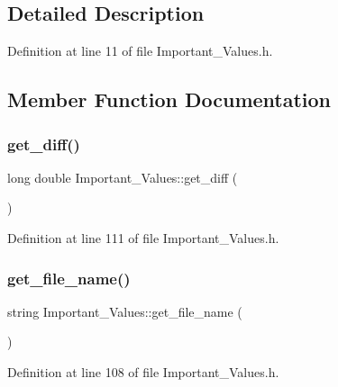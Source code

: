 \subsection{Detailed Description}


Definition at line 11 of file Important\+\_\+\+Values.\+h.



\subsection{Member Function Documentation}
\mbox{\label{class_important___values_af205a5bef6f9e06c353977bacd806104}} 
\subsubsection{\texorpdfstring{get\_diff()}{get\_diff()}}
{\footnotesize\ttfamily long double Important\+\_\+\+Values\+::get\+\_\+diff (\begin{DoxyParamCaption}{ }\end{DoxyParamCaption})\hspace{0.3cm}{\ttfamily [inline]}}



Definition at line 111 of file Important\+\_\+\+Values.\+h.

\mbox{\label{class_important___values_a4dc0dcab1cfe7401c5c1ef674cc0e528}} 
\subsubsection{\texorpdfstring{get\_file\_name()}{get\_file\_name()}}
{\footnotesize\ttfamily string Important\+\_\+\+Values\+::get\+\_\+file\+\_\+name (\begin{DoxyParamCaption}{ }\end{DoxyParamCaption})\hspace{0.3cm}{\ttfamily [inline]}}



Definition at line 108 of file Important\+\_\+\+Values.\+h.

\mbox{\label{class_important___values_aad47270a6a55deffdfb54621f7afead3}} 
